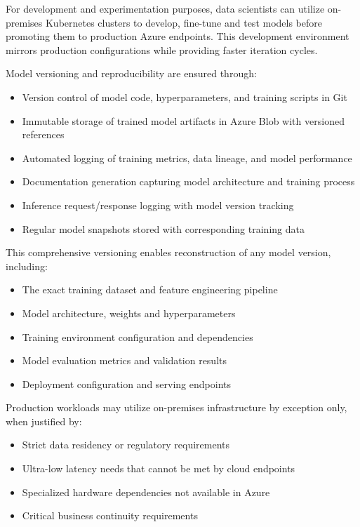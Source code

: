 \documentclass[12pt, a4paper]{article}
\begin{document}
For development and experimentation purposes, data scientists can utilize on-premises Kubernetes clusters to develop, fine-tune and test models before promoting them to production Azure endpoints. This development environment mirrors production configurations while providing faster iteration cycles.

Model versioning and reproducibility are ensured through:

\begin{itemize}
    \item Version control of model code, hyperparameters, and training scripts in Git
    \item Immutable storage of trained model artifacts in Azure Blob with versioned references
    \item Automated logging of training metrics, data lineage, and model performance
    \item Documentation generation capturing model architecture and training process
    \item Inference request/response logging with model version tracking
    \item Regular model snapshots stored with corresponding training data
\end{itemize}

This comprehensive versioning enables reconstruction of any model version, including:
\begin{itemize}
    \item The exact training dataset and feature engineering pipeline
    \item Model architecture, weights and hyperparameters
    \item Training environment configuration and dependencies
    \item Model evaluation metrics and validation results
    \item Deployment configuration and serving endpoints
\end{itemize}

Production workloads may utilize on-premises infrastructure by exception only, when justified by:
\begin{itemize}
    \item Strict data residency or regulatory requirements
    \item Ultra-low latency needs that cannot be met by cloud endpoints
    \item Specialized hardware dependencies not available in Azure
    \item Critical business continuity requirements
\end{itemize}
\end{document}
